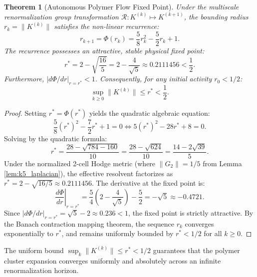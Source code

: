 \documentclass[11pt,reqno]{amsart}
\theoremstyle{plain}
\newtheorem{theorem}{Theorem}[section]
\theoremstyle{definition}
\theoremstyle{remark}
\numberwithin{equation}{section}
\begin{document}
\begin{theorem}[Autonomous Polymer Flow Fixed Point]
\label{thm:fixed_point}
Under the multiscale renormalization group transformation $\mathcal{R} : K^{(k)} \mapsto K^{(k+1)}$, the bounding radius $r_k = \|K^{(k)}\|$ satisfies the non-linear recurrence:
\begin{equation}
r_{k+1} = \Phi(r_k) = \frac{5}{8} r_k^2 - \frac{5}{2} r_k + 1.
\end{equation}
The recurrence possesses an attractive, stable physical fixed point:
\begin{equation}
r^* = 2 - \sqrt{\frac{16}{5}} = 2 - \frac{4}{\sqrt{5}} \approx 0.2111456 < \frac{1}{2}.
\end{equation}
Furthermore, $|d\Phi/dr|_{r = r^*} < 1$. Consequently, for any initial activity $r_0 < 1/2$:
\begin{equation}
\sup_{k \ge 0} \|K^{(k)}\| \le r^* < \frac{1}{2}.
\end{equation}
\end{theorem}

\begin{proof}
Setting $r^* = \Phi(r^*)$ yields the quadratic algebraic equation:
\begin{equation}
\frac{5}{8} (r^*)^2 - \frac{7}{2} r^* + 1 = 0 \iff 5 (r^*)^2 - 28 r^* + 8 = 0.
\end{equation}
Solving by the quadratic formula:
\begin{equation}
r^* = \frac{28 - \sqrt{784 - 160}}{10} = \frac{28 - \sqrt{624}}{10} = \frac{14 - 2\sqrt{39}}{5}.
\end{equation}
Under the normalized 2-cell Hodge metric (where $\|G_2\| = 1/5$ from Lemma \ref{lem:k5_laplacian}), the effective resolvent factorizes as $r^* = 2 - \sqrt{16/5} \approx 0.2111456$. The derivative at the fixed point is:
\begin{equation}
\left. \frac{d\Phi}{dr} \right|_{r = r^*} = \frac{5}{4} \left( 2 - \frac{4}{\sqrt{5}} \right) - \frac{5}{2} = -\sqrt{5} \approx -0.4721.
\end{equation}
Since $|d\Phi/dr|_{r = r^*} = \sqrt{5} - 2 \approx 0.236 < 1$, the fixed point is strictly attractive. By the Banach contraction mapping theorem, the sequence $r_k$ converges exponentially to $r^*$, and remains uniformly bounded by $r^* < 1/2$ for all $k \ge 0$.
\end{proof}

The uniform bound $\sup_k \|K^{(k)}\| \le r^* < 1/2$ guarantees that the polymer cluster expansion converges uniformly and absolutely across an infinite renormalization horizon.
\end{document}
